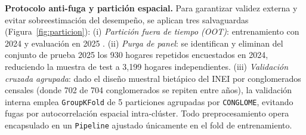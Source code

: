 \textbf{Protocolo anti-fuga y partición espacial.} Para garantizar validez externa y evitar sobreestimación del desempeño, se aplican tres salvaguardas (Figura~\ref{fig:particion}): (i) \textit{Partición fuera de tiempo (OOT)}: entrenamiento con 2024 y evaluación en 2025 \cite{aiken2023moving}. (ii) \textit{Purga de panel}: se identifican y eliminan del conjunto de prueba 2025 los 930 hogares repetidos encuestados en 2024, reduciendo la muestra de test a 3,199 hogares independientes. (iii) \textit{Validación cruzada agrupada}: dado el diseño muestral bietápico del INEI por conglomerados censales (donde 702 de 704 conglomerados se repiten entre años), la validación interna emplea \texttt{GroupKFold} de 5 particiones agrupadas por \texttt{CONGLOME}, evitando fugas por autocorrelación espacial intra-clúster. Todo preprocesamiento opera encapsulado en un \texttt{Pipeline} ajustado únicamente en el fold de entrenamiento.

